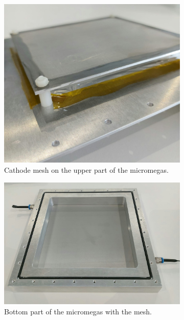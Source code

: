 \documentclass[sn-mathphys-num,iicol]{sn-jnl}
\theoremstyle{thmstyleone}
\theoremstyle{thmstyletwo}
\theoremstyle{thmstylethree}
\begin{document}
\begin{figure}[h]
\begin{subfigure}{0.51\textwidth}
        \includegraphics[width=\linewidth]{figures/micromegas_cover.jpeg}
        \caption{Cathode mesh on the upper part of the micromegas.}
        \label{fig:micromegas_cover}
    \end{subfigure}
    \begin{subfigure}{0.62\textwidth}
      \includegraphics[width=\linewidth]{figures/micromegas_base_top.jpeg}
      \caption{Bottom part of the micromegas with the mesh.}
      \label{fig:micromegas_base}
    \end{subfigure}
    \begin{subfigure}{0.36\textwidth}

\end{subfigure}
\end{figure}
\end{document}

